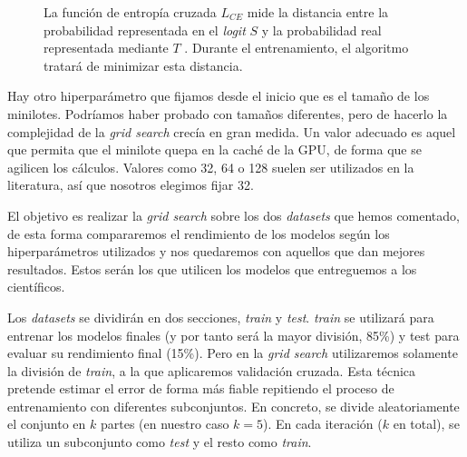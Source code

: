 \begin{figure}[H]
\centering
    \caption{La función de entropía cruzada $L_{CE}$ mide la distancia entre la probabilidad representada en el \textit{logit} $S$ y la probabilidad real representada mediante $T$ \cite{crossentropyloss}. Durante el entrenamiento, el algoritmo tratará de minimizar esta distancia.}
\end{figure}

Hay otro hiperparámetro que fijamos desde el inicio que es el tamaño de los minilotes. Podríamos haber probado con tamaños diferentes, pero de hacerlo la complejidad de la \textit{grid search} crecía en gran medida. Un valor adecuado es aquel que permita que el minilote quepa en la caché de la GPU, de forma que se agilicen los cálculos. Valores como 32, 64 o 128 suelen ser utilizados en la literatura, así que nosotros elegimos fijar 32.

El objetivo es realizar la \textit{grid search} sobre los dos \textit{datasets} que hemos comentado, de esta forma compararemos el rendimiento de los modelos según los hiperparámetros utilizados y nos quedaremos con aquellos que dan mejores resultados. Estos serán los que utilicen los modelos que entreguemos a los científicos.

Los \textit{datasets} se dividirán en dos secciones, \textit{train} y \textit{test}. \textit{train} se utilizará para entrenar los modelos finales (y por tanto será la mayor división, 85\%) y test para evaluar su rendimiento final (15\%). Pero en la \textit{grid search} utilizaremos solamente la división de \textit{train}, a la que aplicaremos validación cruzada. Esta técnica pretende estimar el error de forma más fiable repitiendo el proceso de entrenamiento con diferentes subconjuntos. En concreto, se divide aleatoriamente el conjunto en $k$ partes (en nuestro caso $k=5$). En cada iteración ($k$ en total), se utiliza un subconjunto como \textit{test} y el resto como \textit{train}. \cite{berzal2018redes}

